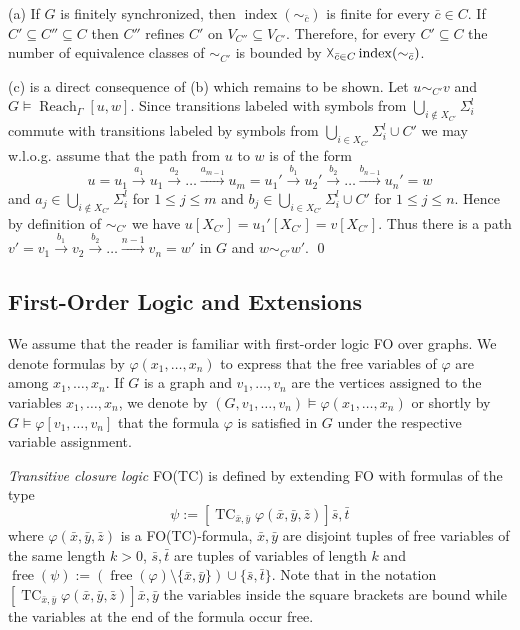 \documentclass{LMCS}
\renewcommand{\phi}{\varphi}
\DeclareMathOperator{\free}{free}
\DeclareMathOperator{\TC}{TC}
\DeclareMathOperator{\Reach}{Reach}
\DeclareMathOperator{\ind}{index}
\begin{document}
\proof
(a) If $G$ is finitely synchronized, then $\ind(\sim_{\bar c})$ is finite for every $\bar c \in C$.
    If $C' \subseteq C'' \subseteq C$ then $C''$ refines $C'$ on $V_{C''} \subseteq V_{C'}$. Therefore, 
    for every $C' \subseteq C$ the number of equivalence classes of $\sim_{C'}$ is bounded by
    $\vartimes_{\bar c \in C}\ind(\sim_{\bar c})$.

(c) is a direct consequence of (b) which remains to be 
    shown. Let $u \sim_{C'} v$ and $G \models \Reach_{\Gamma}[u,w]$.
    Since transitions labeled with  symbols from $\bigcup_{i \notin X_{C'}} \Sigma_i^l$ 
    commute with transitions labeled by symbols from  $\bigcup_{i \in X_{C'}} \Sigma_i^l \cup C'$
    we may w.l.o.g. assume that the path from $u$ to $w$ is of the form
    \[u=u_1 \xrightarrow{a_1} u_1 \xrightarrow{a_2} \ldots \xrightarrow{a_{m-1}} u_m = u_1' \xrightarrow{b_1} u_2'
      \xrightarrow{b_2} \ldots \xrightarrow{b_{n-1}} u_n' = w\]
    and $a_j \in \bigcup_{i \notin X_{C'}} \Sigma_i^l$ for $1 \le j \le m$ and $b_j \in 
    \bigcup_{i \in X_{C'}} \Sigma_i^l \cup C'$ for $ 1 \le j \le n$.
    Hence by definition of $\sim_{C'}$ we have $u[X_{C'}]=u_1'[X_{C'}]=v[X_{C'}]$. Thus
    there is a path $v'=v_1 \xrightarrow{b_1} v_2  \xrightarrow{b_2} \ldots \xrightarrow{n-1} v_n =w'$ in $G$
    and $w \sim_{C'} w'$.
\qed
    

\subsection{First-Order Logic and Extensions}

We assume that the reader is familiar with first-order logic FO 
over graphs. We denote formulas by $\phi(x_1,\ldots,x_n)$ to express that 
the free variables of $\phi$ are among $x_1,\ldots,x_n$. If $G$ is a graph and
$v_1,\ldots,v_n$ are the vertices assigned to the variables $x_1,\ldots,x_n$, we
denote by $(G,v_1,\ldots,v_n) \models \phi(x_1,\ldots,x_n)$ or shortly by
$G \models \phi[v_1,\ldots,v_n]$ that the formula $\phi$ is satisfied in $G$
under the respective variable assignment.

\emph{Transitive closure logic} FO(TC) is defined by extending 
FO with formulas of the type 
\[\psi:=\left[\TC_{\bar x, \bar y} \phi(\bar x, \bar y, \bar z)\right]\bar s, \bar t\]
where $\phi(\bar x, \bar y, \bar z)$ is a FO(TC)-formula, $\bar x, \bar y$ are disjoint 
tuples of free variables of the same length $k>0$,  $\bar s, \bar t$ are tuples of 
variables of length $k$ and $\free(\psi):=(\free(\phi)\setminus \{\bar x, \bar y\})
\cup \{\bar s, \bar t\}$. Note that in the notation 
$\left[\TC_{\bar x, \bar y} \phi(\bar x, \bar y, \bar z)\right]\bar x, \bar y$
the variables inside the square brackets are bound while the variables at the end of the formula
occur free.
\end{document}
